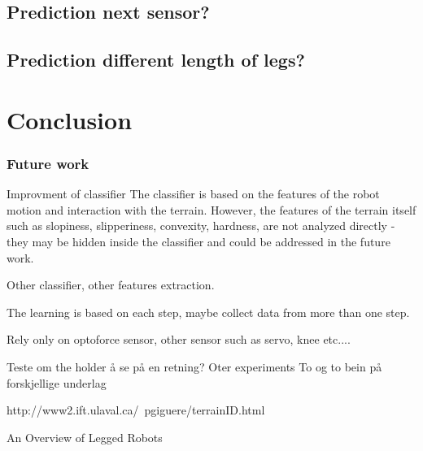 \documentclass[USenglish]{ifimaster}  %
\begin{document}
\section{Prediction next sensor?}


\section{Prediction different length of legs?}

\chapter{Conclusion}



\subsection{Future work}
Improvment of classifier
The classifier is based on the features of the robot motion and interaction with the terrain. However, the features of the terrain itself such as slopiness, slipperiness, convexity, hardness, are not analyzed directly - they may be hidden inside the classifier and could be addressed in the future work.

Other classifier, other features extraction.

The learning is based on each step, maybe collect data from more than one step.

Rely only on optoforce sensor, other sensor such as servo, knee etc....

Teste om the holder å se på en retning?
Oter experiments
To og to bein på forskjellige underlag

http://www2.ift.ulaval.ca/~pgiguere/terrainID.html


An Overview of Legged Robots

\backmatter{}


\end{document}
